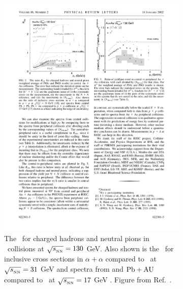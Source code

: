 \begin{figure}
\begin{subfigure}{.5\textwidth}
\centering
\includegraphics[width=\textwidth]{figures/jetMeasurements/hadron_raa}
\caption{The \RAA\ for charged hadrons and neutral pions in \AuAu\ collisions at $\mbox{$\sqrt{s_{_\text{NN}}}$} = 130$ GeV.
Also shown is the \RAA\ for inclusive cross sections in $\alpha+\alpha$ compared to \pp\ at $\mbox{$\sqrt{s_{_\text{NN}}}$} = 31$ GeV \cite{ANGELIS1987213} and spectra from \pbpb and $\rm{Pb}+{\rm AU}$ compared to \pp\ at $\mbox{$\sqrt{s_{_\text{NN}}}$} = 17$ GeV \cite{PhysRevC.64.034901}.
Figure from Ref.~\cite{PhysRevLett.88.022301}.}
\label{fig:hadron_raa}
\end{subfigure} \qquad
\begin{subfigure}{.5\textwidth}
\centering

\end{subfigure}
\end{figure}

